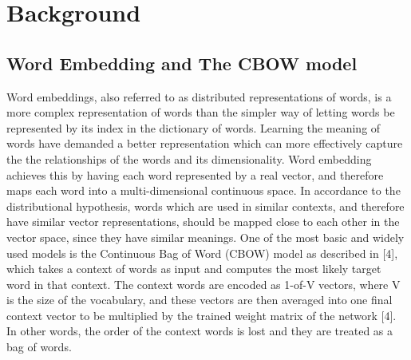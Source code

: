 \section{Background}
\subsection{Word Embedding and The CBOW model}
Word embeddings, also referred to as distributed representations of words, is a more complex representation of words than the simpler way of letting words be represented by its index in the dictionary of words. Learning the meaning of words have demanded a better representation which can more effectively capture the the relationships of the words and its dimensionality. Word embedding achieves this by having each word represented by a real vector, and therefore maps each word into a multi-dimensional continuous space. In accordance to the distributional hypothesis, words which are used in similar contexts, and therefore have similar vector representations, should be mapped close to each other in the vector space, since they have similar meanings. One of the most basic and widely used models is the Continuous Bag of Word (CBOW) model as described in [4], which takes a context of words as input and computes the most likely target word in that context. The context words are encoded as 1-of-V vectors, where V is the size of the vocabulary, and these vectors are then averaged into one final context vector to be multiplied by the trained weight matrix of the network [4]. In other words, the order of the context words is lost and they are treated as a bag of words.
